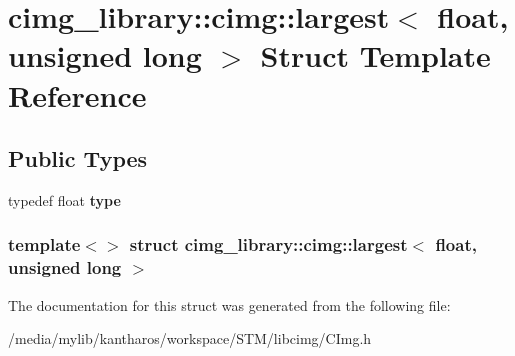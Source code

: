 \hypertarget{structcimg__library_1_1cimg_1_1largest_3_01float_00_01unsigned_01long_01_4}{
\section{cimg\_\-library::cimg::largest$<$ float, unsigned long $>$ Struct Template Reference}
\label{structcimg__library_1_1cimg_1_1largest_3_01float_00_01unsigned_01long_01_4}
}
\subsection*{Public Types}
\begin{DoxyCompactItemize}
\item 
\hypertarget{structcimg__library_1_1cimg_1_1largest_3_01float_00_01unsigned_01long_01_4_a21dd370902d98fd12da85ea7759b7315}{
typedef float {\bfseries type}}
\label{structcimg__library_1_1cimg_1_1largest_3_01float_00_01unsigned_01long_01_4_a21dd370902d98fd12da85ea7759b7315}

\end{DoxyCompactItemize}
\subsubsection*{template$<$$>$ struct cimg\_\-library::cimg::largest$<$ float, unsigned long $>$}



The documentation for this struct was generated from the following file:\begin{DoxyCompactItemize}
\item 
/media/mylib/kantharos/workspace/STM/libcimg/CImg.h\end{DoxyCompactItemize}
